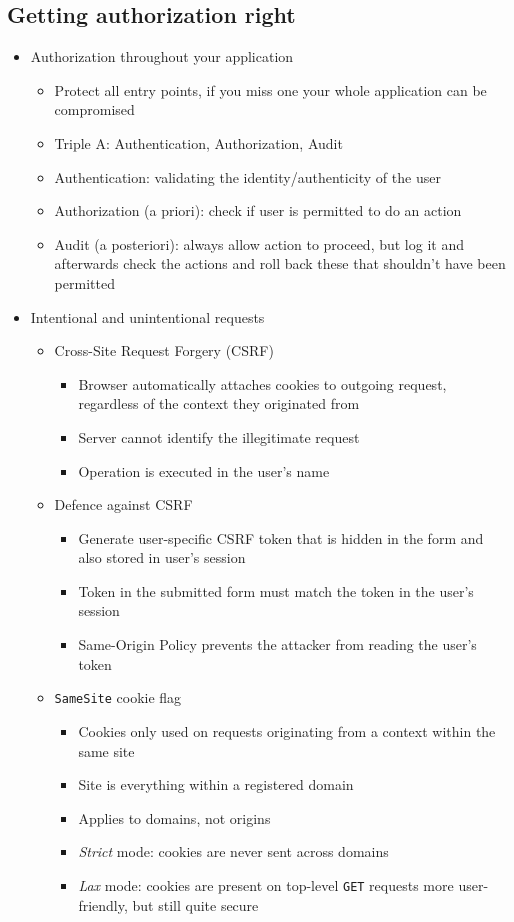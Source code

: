 \documentclass[12pt,titlepage,a4paper]{report}
\begin{document}
	\subsection{Getting authorization right}
	\begin{itemize}
		\item Authorization throughout your application
		\begin{itemize}
			\item Protect all entry points, if you miss one your whole application can be compromised
			\item Triple A: Authentication, Authorization, Audit
			\item Authentication: validating the identity/authenticity of the user
			\item Authorization (a priori): check if user is permitted to do an action
			\item Audit (a posteriori): always allow action to proceed, but log it and afterwards check the actions and roll back these that shouldn't have been permitted
		\end{itemize}
	
		\item Intentional and unintentional requests
		\begin{itemize}
			\item Cross-Site Request Forgery (CSRF)
			\begin{itemize}
				\item Browser automatically attaches cookies to outgoing request, regardless of the context they originated from
				\item Server cannot identify the illegitimate request
				\item Operation is executed in the user's name
			\end{itemize}
			\item Defence against CSRF
			\begin{itemize}
				\item Generate user-specific CSRF token that is hidden in the form and also stored in user's session
				\item Token in the submitted form must match the token in the user's session
				\item Same-Origin Policy prevents the attacker from reading the user's token
			\end{itemize}
			\item \texttt{SameSite} cookie flag
			\begin{itemize}
				\item Cookies only used on requests originating from a context within the same site
				\item Site is everything within a registered domain
				\item Applies to domains, not origins
				\item \emph{Strict} mode: cookies are never sent across domains
				\item \emph{Lax} mode: cookies are present on top-level \texttt{GET} requests
					\subitem more user-friendly, but still quite secure
			\end{itemize}
		\end{itemize}
		

\end{itemize}
\end{document}
